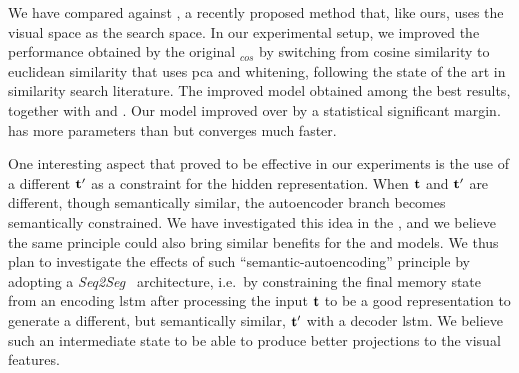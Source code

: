 We have compared against \wordvisual{}, a recently proposed method that, like ours, uses the visual space as the search space.
In our experimental setup, we improved the performance obtained by the original \wordvisual{}$_{cos}$ by switching from cosine similarity to euclidean similarity that uses \gls{pca} and whitening, following the state of the art in similarity search literature.
The improved \wordvisual{} model obtained among the best results, together with \densettv{} and \widedeepttv{}.
Our \widedeepttv{} model improved over \wordvisual{} by a statistical significant margin.
\widedeepttv{} has more parameters than \wordvisual{} but converges much faster.

One interesting aspect that proved to be effective in our experiments is the use of a different $\mathbf{t}'$ as a constraint for the hidden representation.
When $\mathbf{t}$ and $\mathbf{t}'$ are different, though semantically similar, the autoencoder branch becomes semantically constrained.
We have investigated this idea in the \sparsettv{}, and we believe the same principle could also bring similar benefits for the \densettv{} and \widedeepttv{} models.
We thus plan to investigate the effects of such ``semantic-autoencoding'' principle by adopting a  \emph{Seq2Seg}~\cite{cho2014learning} architecture, i.e.\ by constraining the final memory state from an encoding \gls{lstm} after processing the input $\mathbf{t}$ to be a good representation to generate a different, but semantically similar, $\mathbf{t}'$ with a decoder \gls{lstm}.
We believe such an intermediate state to be able to produce better projections to the visual features.

